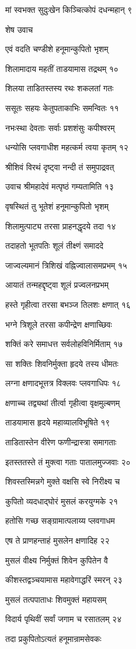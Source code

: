 मां स्वभक्त सुदुःखेन किञ्चित्कोपं दधन्महान् ९

शेष उवाच

एवं वदति चण्डीशे हनूमान्कुपितो भृशम्

शिलामादाय महतीं ताडयामास तद्रथम् १०

शिलया ताडितस्तस्य रथः शकलतां गतः

ससूतः सहयः केतुपताकाभिः समन्वितः ११

नभःस्था देवताः सर्वाः प्रशशंसुः कपीश्वरम्

धन्योसि प्लवगाधीश महत्कर्म त्वया कृतम् १२

श्रीशिवं विरथं दृष्ट्वा नन्दी तं समुपाद्रवत्

उवाच श्रीमहादेवं मत्पृष्ठं गम्यतामिति १३

वृषस्थितं तु भूतेशं हनूमान्कुपितो भृशम्

शिलामुत्पाट्य तरसा प्राहनद्धृदये तदा १४

तदाहतो भूतपतिः शूलं तीक्ष्णं समाददे

जाज्वल्यमानं त्रिशिखं वह्निज्वालासमप्रभम् १५

आयातं तन्महद्दृष्ट्वा शूलं प्रज्वलनप्रभम्

हस्ते गृहीत्वा तरसा बभञ्ज तिलशः क्षणात् १६

भग्ने त्रिशूले तरसा कपीन्द्रेण क्षणाच्छिवः

शक्तिं करे समाधत्त सर्वलोहविनिर्मिताम् १७

सा शक्तिः शिवनिर्मुक्ता हृदये तस्य धीमतः

लग्ना क्षणादभूत्तत्र विक्लवः प्लवगाधिपः १८

क्षणाच्च तद्व्यथां तीर्त्वा गृहीत्वा वृक्षमुल्बणम्

ताडयामास हृदये महाव्यालविभूषिते १९

ताडितास्तेन वीरेण फणीन्द्रास्त्रा समागताः

इतस्ततस्ते तं मुक्त्वा गताः पातालमुज्जवाः २०

शिवस्तस्मिन्नगे मुक्ते वक्षसि स्वे निरीक्ष्य च

कुपितो व्यदधाद्घोरं मुसलं करयुग्मके २१

हतोसि गच्छ सङ्ग्रामात्पलाय्य प्लवगाधम

एष ते प्राणहन्ताहं मुसलेन क्षणादिह २२

मुसलं वीक्ष्य निर्मुक्तं शिवेन कुपितेन वै

कीशस्तद्वञ्चयामास महावेगाद्धरिं स्मरन् २३

मुसलं तत्पपाताधः शिवमुक्तं महायसम्

विदार्य पृथिवीं सर्वां जगाम च रसातलम् २४

तदा प्रकुपितोऽत्यतं हनूमान्रामसेवकः

